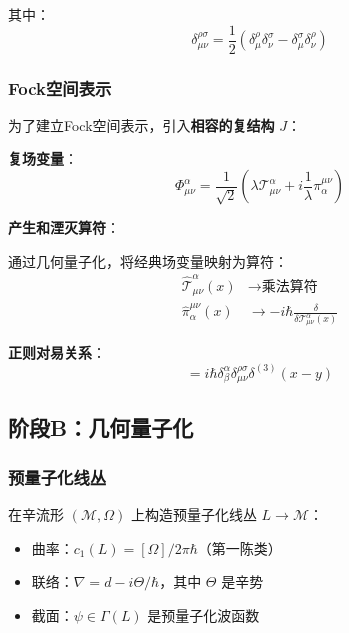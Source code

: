 其中：
\begin{equation}
\delta_{\mu\nu}^{\rho\sigma} = \frac{1}{2}(\delta_\mu^\rho \delta_\nu^\sigma - \delta_\mu^\sigma \delta_\nu^\rho)
\end{equation}

\subsubsection{Fock空间表示}

为了建立Fock空间表示，引入\textbf{相容的复结构} $J$：

\textbf{复场变量}：
\begin{equation}
\Phi_{\mu\nu}^\alpha = \frac{1}{\sqrt{2}}\left(\lambda \mathcal{T}_{\mu\nu}^\alpha + i \frac{1}{\lambda} \pi_\alpha^{\mu\nu}\right)
\end{equation}

\textbf{产生和湮灭算符}：

通过几何量子化，将经典场变量映射为算符：
\begin{align}
\hat{\mathcal{T}}_{\mu\nu}^\alpha(x) &\rightarrow \text{乘法算符} \\
\hat{\pi}_\alpha^{\mu\nu}(x) &\rightarrow -i\hbar \frac{\delta}{\delta \mathcal{T}_{\mu\nu}^\alpha(x)}
\end{align}

\textbf{正则对易关系}：
\begin{equation}
[\hat{\mathcal{T}}^\alpha_{\mu\nu}(x), \hat{\pi}_\beta^{\rho\sigma}(y)] = i\hbar \delta^\alpha_\beta \delta^{\rho\sigma}_{\mu\nu} \delta^{(3)}(x-y)
\end{equation}

\subsection{阶段B：几何量子化}
\label{subsec:stageB_geometric}

\subsubsection{预量子化线丛}

在辛流形 $(\mathcal{M}, \Omega)$ 上构造预量子化线丛 $L \to \mathcal{M}$：

\begin{itemize}
    \item 曲率：$c_1(L) = [\Omega]/2\pi\hbar$（第一陈类）
    \item 联络：$\nabla = d - i\Theta/\hbar$，其中 $\Theta$ 是辛势
    \item 截面：$\psi \in \Gamma(L)$ 是预量子化波函数
\end{itemize}

